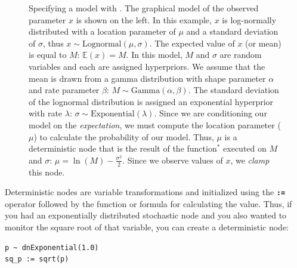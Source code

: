 \documentclass[11pt]{article}
\newcommand{\cl}[1]{{\texttt{\textbf{#1}}}}
\begin{document}
\begin{figure}[h!]
\centering
{}
\caption{\small Specifying a model with \Rev. 
The graphical model of the observed parameter $x$ is shown on the left. 
In this example, $x$ is log-normally distributed with a location parameter of $\mu$ and a standard deviation of $\sigma$, thus $x \sim \mbox{Lognormal}(\mu, \sigma)$. 
The expected value of $x$ (or mean) is equal to $M$: $\mathbb{E}(x) = M$. 
In this model, $M$ and $\sigma$ are random variables and each are assigned hyperpriors. 
We assume that the mean is drawn from a gamma distribution with shape parameter $\alpha$ and rate parameter $\beta$: $M \sim \mbox{Gamma}(\alpha, \beta)$. 
The standard deviation of the lognormal distribution is assigned an exponential hyperprior with rate $\lambda$: $\sigma \sim \mbox{Exponential}(\lambda)$. 
Since we are conditioning our model on the \emph{expectation}, we must compute the location parameter ($\mu$) to 
calculate the probability of our model. 
Thus, $\mu$ is a deterministic node that is the result of the function$^*$ executed on $M$ and $\sigma$: $\mu = \ln(M) - \frac{\sigma^2}{2}$. 
Since we observe values of $x$, we \emph{clamp} this node.
}
\label{revgmexample}
\end{figure}

Deterministic nodes are variable transformations and initialized using the \cl{:=} operator followed by the function or formula for calculating the value. 
Thus, if you had an exponentially distributed stochastic node and you also wanted to monitor the square root of that variable, you can create a deterministic node:
{\tt \begin{snugshade*}
\begin{lstlisting}
p ~ dnExponential(1.0)
sq_p := sqrt(p)
\end{lstlisting}
\end{snugshade*}}
\end{document}
